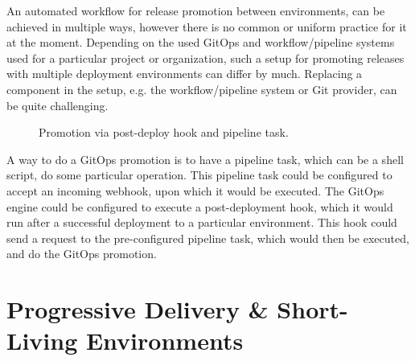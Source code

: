 
An automated workflow for release promotion between environments,
can be achieved in multiple ways,
however there is no common or uniform practice for it at the moment.
Depending on the used GitOps and workflow/pipeline systems used for a particular project or organization,
such a setup for promoting releases with multiple deployment environments can differ by much.
Replacing a component in the setup, e.g. the workflow/pipeline system or Git provider, can be quite challenging.

\begin{figure}[h]
	\centering
	\caption{Promotion via post-deploy hook and pipeline task.
	}
	\label{fig:promotion-by-pipeline-task-post-deploy-hook}	
\end{figure}

A way to do a GitOps promotion is to have a pipeline task, which can be a shell script,
do some particular operation. This pipeline task could be configured to accept an incoming webhook,
upon which it would be executed.
The GitOps engine could be configured to execute a post-deployment hook,
which it would run after a successful deployment to a particular environment.
This hook could send a request to the pre-configured pipeline task, which would then be executed,
and do the GitOps promotion.










\section{Progressive Delivery \& Short-Living Environments}

